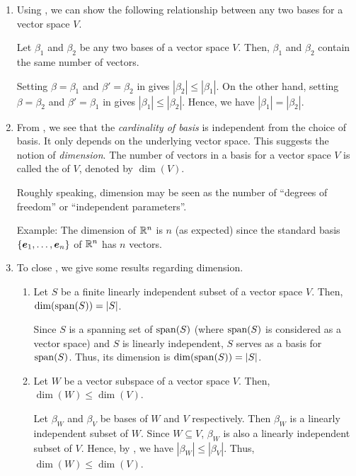 \begin{enumerate}
\item
Using , we can show the following relationship between
any two bases for a vector space \(V\).

\begin{corollary}
\label{cor:two-bases-same-num}
Let \(\beta_1\) and \(\beta_2\) be any two bases of a vector space \(V\). Then,
\(\beta_1\) and \(\beta_2\) contain the same number of vectors.
\end{corollary}

\begin{pf}
Setting \(\beta=\beta_1\) and \(\beta'=\beta_2\) in 
gives \(|\beta_2|\le|\beta_1|\). On the other hand, setting \(\beta=\beta_2\)
and \(\beta'=\beta_1\) in  gives
\(|\beta_1|\le|\beta_2|\). Hence, we have \(|\beta_1|=|\beta_2|\).
\end{pf}

\item From , we see that the \emph{cardinality of
basis} is independent from the choice of basis. It only depends on the
underlying vector space. This suggests the notion of \emph{dimension}. The
number of vectors in a basis for a vector space \(V\) is called the
 of \(V\), denoted by \(\dim(V)\).

\begin{note}
Roughly speaking, dimension may be seen as the number of ``degrees of
freedom'' or ``independent parameters''.
\end{note}

Example: The dimension of \(\mathbb{R}^n\) is \(n\) (as expected) since the standard
basis \(\{\vb*{e}_1,\dotsc,\vb*{e}_n\}\) of \(\mathbb{R}^n\) has \(n\) vectors.

\item To close , we give some results regarding dimension.
\begin{enumerate}
\item \label{it:dim-span} Let \(S\) be a finite linearly independent subset of
a vector space \(V\). Then, \(\dim(\operatorname{span}(S))=|S|\).

\begin{pf}
Since \(S\) is a spanning set of \(\operatorname{span}(S)\) (where \(\operatorname{span}(S)\) is considered
as a vector space) and \(S\) is linearly independent, \(S\) serves as a basis
for \(\operatorname{span}(S)\). Thus, its dimension is \(\dim(\operatorname{span}(S))=|S|\).
\end{pf}
\item \label{it:dim-subspace} Let \(W\) be a vector subspace of a vector space
\(V\). Then, \(\dim(W)\le \dim(V)\).

\begin{pf}
Let \(\beta_W\) and \(\beta_V\) be bases of \(W\) and \(V\) respectively. Then
\(\beta_W\) is a linearly independent subset of \(W\). Since \(W\subseteq V\),
\(\beta_W\) is also a linearly independent subset of \(V\). Hence, by
, we have \(|\beta_W|\le |\beta_V|\). Thus,
\(\dim(W)\le \dim(V)\).
\end{pf}
\end{enumerate}
\end{enumerate}
